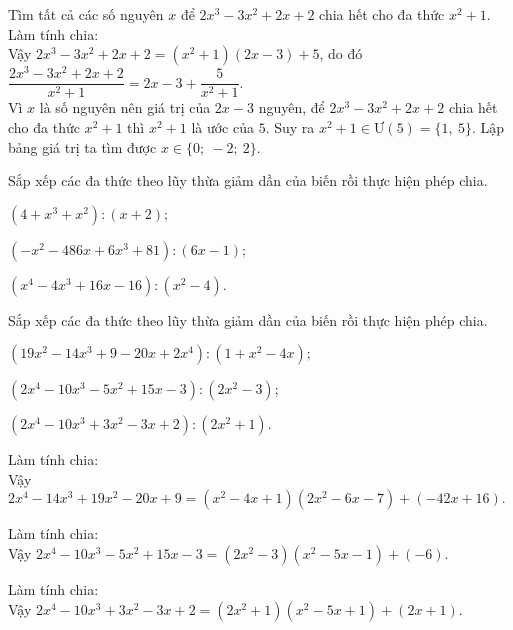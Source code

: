 	\begin{vd}  %
		Tìm tất cả các số nguyên $x$ để $2x^3-3x^2+2x+2$ chia hết cho đa thức $x^2+1.$
\loigiai
{
 Làm tính chia: \\
		Vậy $2x^3-3x^2+2x+2=(x^2+1)(2x-3)+5$, do đó $\dfrac{2x^3-3x^2+2x+2}{x^2+1}=2x-3+\dfrac{5}{x^2+1}.$\\
		Vì $x$ là số nguyên nên giá trị của $2x-3$ nguyên, để $2x^3-3x^2+2x+2$ chia hết cho đa thức $x^2+1$ thì $x^2+1$ là ước của $5.$ Suy ra $x^2+1\in\mbox{Ư}(5)=\{1,\ 5\}.$ Lập bảng giá trị ta tìm được $x\in\{0;\ -2;\ 2\}$.
}		
		\end{vd}
\btvn
\begin{vn} %
		Sắp xếp các đa thức theo lũy thừa giảm dần của biến rồi thực hiện phép chia.
				\begin{listEX}
			\item $(4+x^3+x^2):(x+2);$
			\item $(-x^2-486x+6x^3+81):(6x-1)$;
			\item $(x^4-4x^3+16x-16):(x^2-4).$
		\end{listEX}
\end{vn}
\begin{vn} %
	Sắp xếp các đa thức theo lũy thừa giảm dần của biến rồi thực hiện phép chia.
	\begin{listEX}
		\item $(19x^2-14x^3+9-20x+2x^4):(1+x^2-4x);$
		\item $(2x^4-10x^3-5x^2+15x-3):(2x^2-3)$;
		\item $(2x^4-10x^3+3x^2-3x+2):(2x^2+1).$
	\end{listEX}
	\loigiai
	{
\begin{listEX}
	\item Làm tính chia: \\
	Vậy $2x^4-14x^3+19x^2-20x+9=(x^2-4x+1)(2x^2-6x-7)+(-42x+16).$
	\item  Làm tính chia: \\
	Vậy $2x^4-10x^3-5x^2+15x-3=(2x^2-3)(x^2-5x-1)+(-6).$
	\item  Làm tính chia: \\
	Vậy $2x^4-10x^3+3x^2-3x+2=(2x^2+1)(x^2-5x+1)+(2x+1).$
\end{listEX}		
	}
\end{vn}
